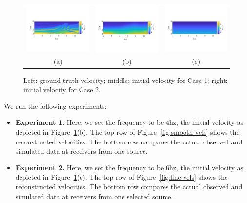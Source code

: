 \documentclass[12pt]{amsart}
\begin{document}
\begin{figure}
\centering
\begin{tabular}{ccc}
\includegraphics[width=0.33\linewidth]{figures/marm-true.png}&
\includegraphics[width=0.33\linewidth]{figures/smooth-init.png}&
\includegraphics[width=0.33\linewidth]{figures/line-init.png}\\
(a)&(b)&(c)\\
\end{tabular}
\caption{Left: ground-truth velocity; middle: initial velocity for Case 1; right: initial velocity for Case 2.}
\label{fig:marm-vels}
\end{figure}

We run the following experiments:
\begin{itemize}
\item \textbf{Experiment 1.} Here, we set the frequency to be $4$hz, the initial velocity as depicted in Figure~\ref{fig:marm-vels}(b). The top row of Figure~\ref{fig:smooth-vels} shows the reconstructed velocities. The bottom row compares the actual observed and simulated data at receivers from one source. 
\item \textbf{Experiment 2.} Here, we set the frequency to be $6$hz, the initial velocity as depicted in Figure~\ref{fig:marm-vels}(c). The top row of Figure~\ref{fig:line-vels} shows the reconstructed velocities. The bottom row compares the actual observed and simulated data at receivers from one selected source. 
\end{itemize}
\end{document}
